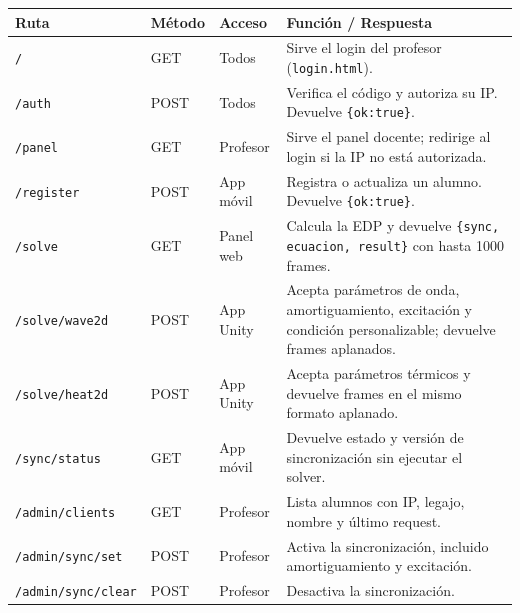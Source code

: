 \documentclass[12pt, a4paper]{article}
\begin{document}
\begin{center}
{\renewcommand{\arraystretch}{1.20}%
\setlength{\tabcolsep}{4pt}%
\footnotesize
\begin{tabular}{llll}
\toprule
\parbox[t]{3.5cm}{\textbf{Ruta}} & \parbox[t]{1.4cm}{\textbf{Método}} & \parbox[t]{2.5cm}{\textbf{Acceso}} & \parbox[t]{5.5cm}{\textbf{Función / Respuesta}} \\
\midrule
\parbox[t]{3.5cm}{\texttt{/}} & \parbox[t]{1.4cm}{GET} & \parbox[t]{2.5cm}{Todos} & \parbox[t]{5.5cm}{\raggedright Sirve el login del profesor (\texttt{login.html}).} \\
\parbox[t]{3.5cm}{\texttt{/auth}} & \parbox[t]{1.4cm}{POST} & \parbox[t]{2.5cm}{Todos} & \parbox[t]{5.5cm}{Verifica el código y autoriza su IP. Devuelve \texttt{\{ok:true\}}.} \\
\parbox[t]{3.5cm}{\texttt{/panel}} & \parbox[t]{1.4cm}{GET} & \parbox[t]{2.5cm}{Profesor} & \parbox[t]{5.5cm}{Sirve el panel docente; redirige al login si la IP no está autorizada.} \\
\parbox[t]{3.5cm}{\texttt{/register}} & \parbox[t]{1.4cm}{POST} & \parbox[t]{2.5cm}{App móvil} & \parbox[t]{5.5cm}{Registra o actualiza un alumno. Devuelve \texttt{\{ok:true\}}.} \\
\parbox[t]{3.5cm}{\texttt{/solve}} & \parbox[t]{1.4cm}{GET} & \parbox[t]{2.5cm}{Panel web} & \parbox[t]{5.5cm}{Calcula la EDP y devuelve \texttt{\{sync, ecuacion, result\}} con hasta 1000 frames.} \\
\parbox[t]{3.5cm}{\texttt{/solve/wave2d}} & \parbox[t]{1.4cm}{POST} & \parbox[t]{2.5cm}{App Unity} & \parbox[t]{5.5cm}{\raggedright Acepta parámetros de onda, amortiguamiento, excitación y condición personalizable; devuelve frames aplanados.} \\
\parbox[t]{3.5cm}{\texttt{/solve/heat2d}} & \parbox[t]{1.4cm}{POST} & \parbox[t]{2.5cm}{App Unity} & \parbox[t]{5.5cm}{Acepta parámetros térmicos y devuelve frames en el mismo formato aplanado.} \\
\parbox[t]{3.5cm}{\texttt{/sync/status}} & \parbox[t]{1.4cm}{GET} & \parbox[t]{2.5cm}{App móvil} & \parbox[t]{5.5cm}{Devuelve estado y versión de sincronización sin ejecutar el solver.} \\
\midrule
\parbox[t]{3.5cm}{\texttt{/admin/clients}} & \parbox[t]{1.4cm}{GET} & \parbox[t]{2.5cm}{Profesor} & \parbox[t]{5.5cm}{Lista alumnos con IP, legajo, nombre y último request.} \\
\parbox[t]{3.5cm}{\texttt{/admin/sync/set}} & \parbox[t]{1.4cm}{POST} & \parbox[t]{2.5cm}{Profesor} & \parbox[t]{5.5cm}{\raggedright Activa la sincronización, incluido amortiguamiento y excitación.} \\
\parbox[t]{3.5cm}{\texttt{/admin/sync/clear}} & \parbox[t]{1.4cm}{POST} & \parbox[t]{2.5cm}{Profesor} & \parbox[t]{5.5cm}{Desactiva la sincronización.} \\
\bottomrule
\end{tabular}}
\end{center}
\end{document}
